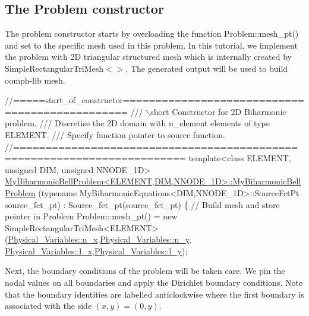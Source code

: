 \hypertarget{index_constructor}{}\subsection{The Problem constructor}\label{index_constructor}
The problem constructor starts by overloading the function {\ttfamily Problem\+::mesh\+\_\+pt()} and set to the specific mesh used in this problem. In this tutorial, we implement the problem with 2D triangular structured mesh which is internally created by {\ttfamily Simple\+Rectangular\+Tri\+Mesh$<$$>$}. The generated output will be used to build {\ttfamily oomph-\/lib} mesh.

 
\begin{DoxyCodeInclude}
\textcolor{comment}{//=====start\_of\_constructor===============================================}
\textcolor{comment}{/// \(\backslash\)short Constructor for 2D Biharmonic problem.}
\textcolor{comment}{}\textcolor{comment}{/// Discretise the 2D domain with n\_element elements of type ELEMENT.}
\textcolor{comment}{}\textcolor{comment}{/// Specify function pointer to source function. }
\textcolor{comment}{}\textcolor{comment}{//========================================================================}
\textcolor{keyword}{template}<\textcolor{keyword}{class} ELEMENT, \textcolor{keywordtype}{unsigned} DIM, \textcolor{keywordtype}{unsigned} NNODE\_1D>
\hyperlink{classMyBiharmonicBellProblem_a61b5ab7db1511188dd7ca00e01179dda}{MyBiharmonicBellProblem<ELEMENT,DIM,NNODE\_1D>::MyBiharmonicBellProblem}
(\textcolor{keyword}{typename} MyBiharmonicEquations<DIM,NNODE\_1D>::SourceFctPt source\_fct\_pt) : 
 Source\_fct\_pt(source\_fct\_pt)
\{ 
 \textcolor{comment}{// Build mesh and store pointer in Problem}
 Problem::mesh\_pt() = \textcolor{keyword}{new} SimpleRectangularTriMesh<ELEMENT>
(\hyperlink{namespacePhysical__Variables_ae766d6695cfb9a8d87be9767b38245ff}{Physical\_Variables::n\_x},\hyperlink{namespacePhysical__Variables_a35801b250816fa72ce9023f8738515fa}{Physical\_Variables::n\_y},
      \hyperlink{namespacePhysical__Variables_af92161eeeab3e15a31698af80f8d09db}{Physical\_Variables::l\_x},\hyperlink{namespacePhysical__Variables_a9f73110ebbfe999c6f09ac797793a537}{Physical\_Variables::l\_y});

\end{DoxyCodeInclude}


Next, the boundary conditions of the problem will be taken care. We pin the nodal values on all boundaries and apply the Dirichlet boundary conditions. Note that the boundary identities are labelled anticlockwise where the first boundary is associated with the side $ (x,y) = (0,y). $


